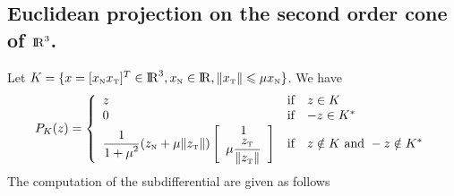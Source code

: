 \subsection{Euclidean projection on the second order cone of $\mathrm{I\!R}^3$.}

Let $K=\{x = [x_{\hbox{\tiny{N}}} x_{\hbox{\tiny{T}}}]^T \in \mathrm{I\!R}^3, x_{\hbox{\tiny{N}}} \in \mathrm{I\!R}, \|x_{{\hbox{\tiny{T}}}}\| \leqslant \mu x_{{\hbox{\tiny{N}}}}\}$. We have 
\begin{equation}
  \label{eq:proj}
  P_{K}(z) =\left\{
  \begin{array}{lcl}
    z &\text{if}& z \in K \\
    0 &\text{if}& -z \in K^* \\
    \Frac 1 {1+\mu^2}(z_\n + \mu \|z_\t\| )
    \left[\begin{array}{c}
      1 \\
      \mu \Frac {z_\t} {\|z_\t\|}
      \end{array}\right]&\text{if}& z \notin K \text{ and } -z \notin K^*
    \end{array}\right. 
  \end{equation}
The computation of the subdifferential are given as follows

